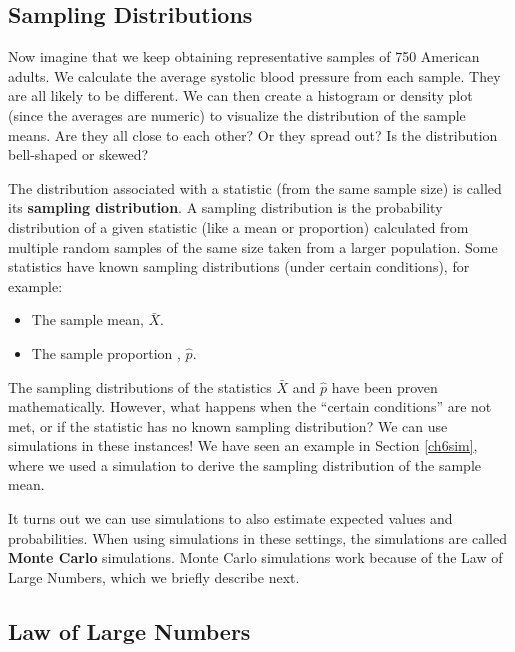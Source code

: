 \documentclass[
]{book}
\providecommand{\tightlist}{%
  \setlength{\itemsep}{0pt}\setlength{\parskip}{0pt}}
\theoremstyle{definition}
\theoremstyle{definition}
\theoremstyle{definition}
\theoremstyle{definition}
\theoremstyle{remark}
\begin{document}
\hypertarget{sampling-distributions}{%
\subsection{Sampling Distributions}\label{sampling-distributions}}

Now imagine that we keep obtaining representative samples of 750 American adults. We calculate the average systolic blood pressure from each sample. They are all likely to be different. We can then create a histogram or density plot (since the averages are numeric) to visualize the distribution of the sample means. Are they all close to each other? Or they spread out? Is the distribution bell-shaped or skewed?

The distribution associated with a statistic (from the same sample size) is called its \textbf{sampling distribution}. A sampling distribution is the probability distribution of a given statistic (like a mean or proportion) calculated from multiple random samples of the same size taken from a larger population. Some statistics have known sampling distributions (under certain conditions), for example:

\begin{itemize}
\tightlist
\item
  The sample mean, \(\bar{X}\).
\item
  The sample proportion , \(\hat{p}\).
\end{itemize}

The sampling distributions of the statistics \(\bar{X}\) and \(\hat{p}\) have been proven mathematically. However, what happens when the ``certain conditions'' are not met, or if the statistic has no known sampling distribution? We can use simulations in these instances! We have seen an example in Section \ref{ch6sim}, where we used a simulation to derive the sampling distribution of the sample mean.

It turns out we can use simulations to also estimate expected values and probabilities. When using simulations in these settings, the simulations are called \textbf{Monte Carlo} simulations. Monte Carlo simulations work because of the Law of Large Numbers, which we briefly describe next.

\hypertarget{law-of-large-numbers}{%
\subsection{Law of Large Numbers}\label{law-of-large-numbers}}
\end{document}
